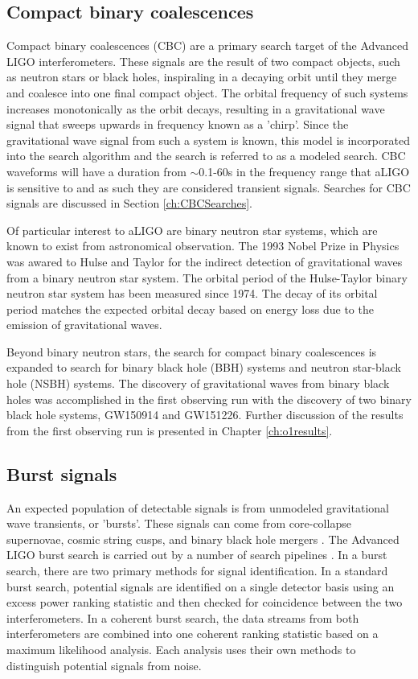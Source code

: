 \subsection{Compact binary coalescences}

Compact binary coalescences (CBC) are a primary search target of the 
Advanced LIGO interferometers. These signals are the result of two 
compact objects, such as neutron stars or black holes, inspiraling 
in a decaying orbit until they merge and coalesce into one final 
compact object. The orbital frequency of such systems increases 
monotonically as the orbit decays, resulting in a gravitational 
wave signal that sweeps upwards in frequency known as a 'chirp'. 
Since the gravitational wave signal from such a system is known, 
this model is incorporated into the search algorithm and the 
search is referred to as a modeled search. CBC waveforms will 
have a duration from $\sim$0.1-60s in the frequency range that
aLIGO is sensitive to and as such they are considered transient 
signals. Searches for CBC 
signals are discussed in Section \ref{ch:CBCSearches}.

Of particular interest to aLIGO are binary neutron star systems, 
which are known to exist from astronomical 
observation. The 1993 Nobel Prize in Physics was awared to Hulse and 
Taylor for the indirect detection of gravitational waves from a binary 
neutron star system. The orbital 
period of the Hulse-Taylor binary neutron star system has been measured 
since 1974. The decay of its orbital period matches the 
expected orbital decay based on energy loss due to the emission of 
gravitational waves. 

Beyond binary neutron stars, the search for compact binary coalescences 
is expanded to search for binary black hole (BBH) systems and neutron star-black 
hole (NSBH) systems. The discovery of gravitational waves from binary black holes 
was accomplished in the 
first observing run with the discovery of two binary black hole systems, GW150914 
and GW151226. Further discussion of the results from the first observing run is 
presented in Chapter \ref{ch:o1results}.

\subsection{Burst signals}

An expected population of detectable signals is from unmodeled gravitational 
wave transients, or 'bursts'. These signals can come from core-collapse 
supernovae, cosmic string cusps, and binary black hole mergers 
\cite{Damour:2004kw,GW150914-BURST,lrr-2011-1}. The Advanced LIGO burst 
search is carried out by a number of search pipelines 
\cite{Lynch:2015,BayesWave,Klimenko:2007hd}. 
In a burst search, there are two primary methods for signal identification. 
In a standard burst search, potential signals are identified on a single detector 
basis using an excess power ranking statistic and then checked for coincidence 
between the two interferometers. In a coherent burst search, the data streams 
from both interferometers are combined into one coherent ranking statistic based 
on a maximum likelihood analysis. Each analysis uses their own methods to 
distinguish potential signals from noise.

